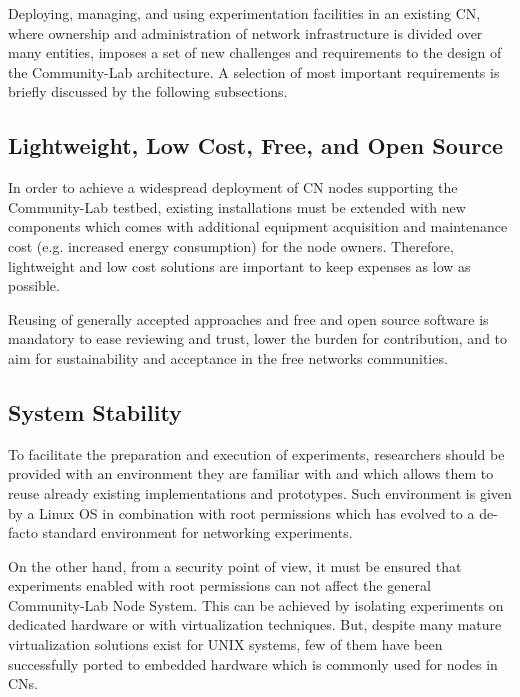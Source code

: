 \documentclass[conference]{IEEEtran}
\begin{document}
Deploying, managing, and using experimentation facilities in an
existing CN, where ownership and administration of network
infrastructure is divided over many entities, imposes a set of new
challenges and requirements to the design of the Community-Lab
architecture. A selection of most important requirements is briefly
discussed by the following subsections.


\subsection{Lightweight, Low Cost, Free, and Open Source}

In order to achieve a widespread deployment of CN nodes supporting the
Community-Lab testbed, existing installations must be extended with new
components which comes with additional equipment acquisition and
maintenance cost (e.g. increased energy consumption) for the node
owners. Therefore, lightweight and low cost solutions are important to
keep expenses as low as possible.

Reusing of generally accepted approaches and free and open source
software is mandatory to ease reviewing and trust, lower the burden
for contribution, and to aim for sustainability and acceptance in the
free networks communities.

\subsection{System Stability}

To facilitate the preparation and execution of experiments,
researchers should be provided with an environment they are familiar
with and which allows them to reuse already existing implementations
and prototypes.  Such environment is given by a Linux OS in
combination with root permissions which has evolved to a de-facto
standard environment for networking experiments.

On the other hand, from a security point of view, it must be ensured
that experiments enabled with root permissions can not affect the
general Community-Lab Node System. This can be achieved by isolating
experiments on dedicated hardware or with virtualization techniques.
But, despite many mature virtualization solutions exist for UNIX
systems, few of them have been successfully ported to embedded
hardware which is commonly used for nodes in CNs.
\end{document}
